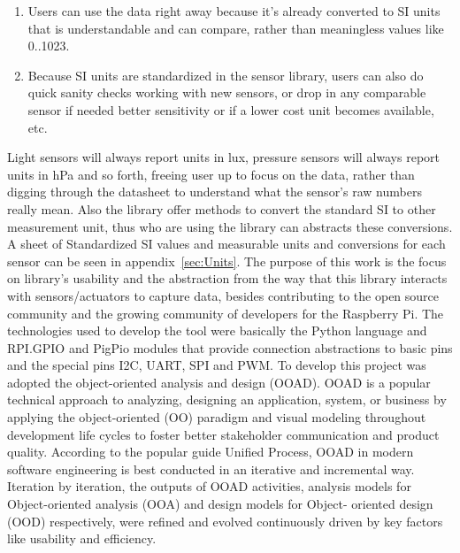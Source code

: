 \documentclass{acm_proc_article-sp}
\begin{document}
\begin{enumerate}
\item Users can use the data right away because it's already converted to SI units that is understandable and can compare, rather than meaningless values like 0..1023.
\item Because SI units are standardized in the sensor library, users can also do quick sanity checks working with new sensors, or drop in any comparable sensor if needed better sensitivity or if a lower cost unit becomes available, etc.
\end{enumerate}

Light sensors will always report units in lux, pressure sensors will always report units in hPa and so forth, freeing user up to focus on the data, rather than digging through the datasheet to understand what the sensor's raw numbers really mean. Also the library offer methods to convert the standard SI to other measurement unit, thus who are using the library can abstracts these conversions. A sheet of Standardized SI values and measurable units and conversions for each sensor can be seen in appendix~\ref{sec:Units}.
\newline
\newline
The purpose of this work is the focus on library's usability and the abstraction from the way that this library interacts with sensors/actuators to capture data, besides contributing to the open source community and the growing community of developers for the Raspberry Pi.
\newline
\newline
The technologies used to develop the tool were basically the Python language and RPI.GPIO and PigPio modules that provide connection abstractions to basic pins and the special pins I2C, UART, SPI and PWM.
\newline
\newline
To develop this project was adopted the object-oriented analysis and design (OOAD). OOAD is a popular technical approach to analyzing, designing an application, system, or business by applying the object-oriented (OO) paradigm and visual modeling throughout development life cycles to foster better stakeholder communication and product quality.
\newline
\newline
According to the popular guide Unified Process, OOAD in modern software engineering is best conducted in an iterative and incremental way. Iteration by iteration, the outputs of OOAD activities, analysis models for Object-oriented analysis (OOA) and design models for Object- oriented design (OOD) respectively, were refined and evolved continuously driven by key factors like usability and efficiency.
\end{document}
